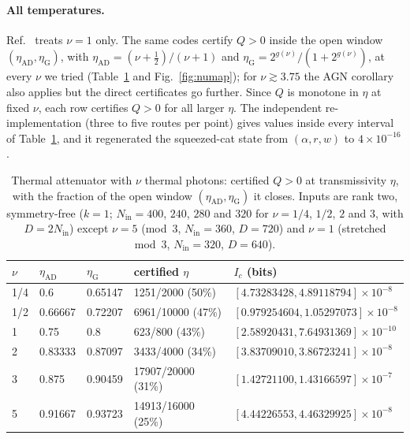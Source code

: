 \documentclass[aps,pra,reprint,superscriptaddress,nofootinbib,longbibliography,floatfix]{revtex4-2}
\theoremstyle{remark}
\newcommand{\Ic}{I_c}
\begin{document}
\paragraph*{All temperatures.} Ref.~\cite{mele2026thermal} treats $\nu=1$ only. The same codes certify $Q>0$
inside the open window $(\eta_{\mathrm{AD}},\eta_{\mathrm G})$, with $\eta_{\mathrm{AD}}=(\nu+\frac12)/(\nu+1)$
and $\eta_{\mathrm G}=2^{g(\nu)}/(1+2^{g(\nu)})$, at every $\nu$ we tried (Table~\ref{tab:nu} and
Fig.~\ref{fig:numap}); for $\nu\gtrsim3.75$ the AGN corollary also applies but the direct certificates go
further. Since $Q$ is monotone in $\eta$ at fixed $\nu$, each row certifies $Q>0$ for all larger $\eta$. The independent re-implementation (three to five routes per point) gives values inside every interval of
Table~\ref{tab:nu}, and it regenerated the squeezed-cat state from $(\alpha,r,w)$ to $4\times10^{-16}$.

\begin{table}[t]
\caption{Thermal attenuator with $\nu$ thermal photons: certified $Q>0$ at transmissivity $\eta$, with the
fraction of the open window $(\eta_{\mathrm{AD}},\eta_{\mathrm G})$ it closes. Inputs are rank two,
symmetry-free ($k=1$; $N_{\mathrm{in}}=400$, $240$, $280$ and $320$ for $\nu=1/4$, $1/2$, $2$ and $3$, with
$D=2N_{\mathrm{in}}$) except $\nu=5$ (mod~3, $N_{\mathrm{in}}=360$, $D=720$) and $\nu=1$ (stretched mod~3,
$N_{\mathrm{in}}=320$, $D=640$).}
\label{tab:nu}
\begin{ruledtabular}
\begin{tabular}{lllll}
$\nu$ & $\eta_{\mathrm{AD}}$ & $\eta_{\mathrm G}$ & certified $\eta$ & $\Ic$ (bits)\\
\hline
1/4 & 0.6 & 0.65147 & 1251/2000 (50\%) & $[4.73283428,4.89118794]\times10^{-8}$\\
1/2 & 0.66667 & 0.72207 & 6961/10000 (47\%) & $[0.979254604,1.05297073]\times10^{-8}$\\
1 & 0.75 & 0.8 & 623/800 (43\%) & $[2.58920431,7.64931369]\times10^{-10}$\\
2 & 0.83333 & 0.87097 & 3433/4000 (34\%) & $[3.83709010,3.86723241]\times10^{-8}$\\
3 & 0.875 & 0.90459 & 17907/20000 (31\%) & $[1.42721100,1.43166597]\times10^{-7}$\\
5 & 0.91667 & 0.93723 & 14913/16000 (25\%) & $[4.44226553,4.46329925]\times10^{-8}$\\
\end{tabular}
\end{ruledtabular}
\end{table}
\end{document}

